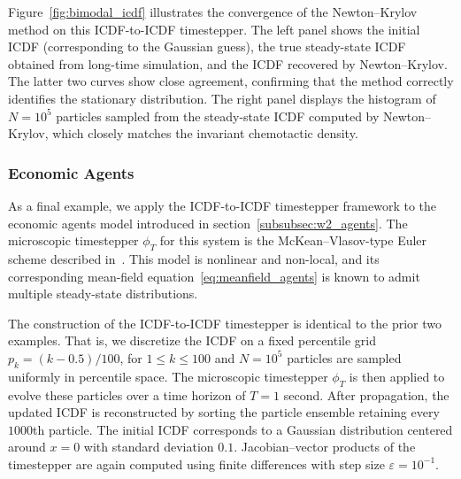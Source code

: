 \documentclass{article}
\begin{document}
Figure~\ref{fig:bimodal_icdf} illustrates the convergence of the Newton–Krylov method on this ICDF-to-ICDF timestepper. The left panel shows the initial ICDF (corresponding to the Gaussian guess), the true steady-state ICDF obtained from long-time simulation, and the ICDF recovered by Newton–Krylov. The latter two curves show close agreement, confirming that the method correctly identifies the stationary distribution. The right panel displays the histogram of $N = 10^5$ particles sampled from the steady-state ICDF computed by Newton–Krylov, which closely matches the invariant chemotactic density.

\subsubsection{Economic Agents}
As a final example, we apply the ICDF-to-ICDF timestepper framework to the economic agents model introduced in section~\ref{subsubsec:w2_agents}. The microscopic timestepper $\phi_T$ for this system is the McKean–Vlasov-type Euler scheme described in~\cite{fabiani2024task}. This model is nonlinear and non-local, and its corresponding mean-field equation~\eqref{eq:meanfield_agents} is known to admit multiple steady-state distributions.

The construction of the ICDF-to-ICDF timestepper is identical to the prior two examples. That is, we discretize the ICDF on a fixed percentile grid $p_k = (k - 0.5)/100$, for $1 \leq k \leq 100$ and $N = 10^5$ particles are sampled uniformly in percentile space. The microscopic timestepper $\phi_T$ is then applied to evolve these particles over a time horizon of $T = 1$ second. After propagation, the updated ICDF is reconstructed by sorting the particle ensemble retaining every $1000$th particle. The initial ICDF corresponds to a Gaussian distribution centered around $x = 0$ with standard deviation $0.1$. Jacobian–vector products of the timestepper are again computed using finite differences with step size $\varepsilon = 10^{-1}$.
\end{document}
